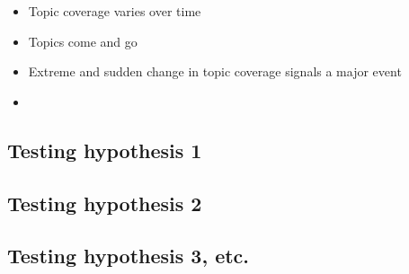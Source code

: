 \begin{itemize}
    \item Topic coverage varies over time
    \item Topics come and go
    \item Extreme and sudden change in topic coverage signals a major event
    \item 
\end{itemize}

\subsection{Testing hypothesis 1}
\subsection{Testing hypothesis 2}
\subsection{Testing hypothesis 3, etc.}
